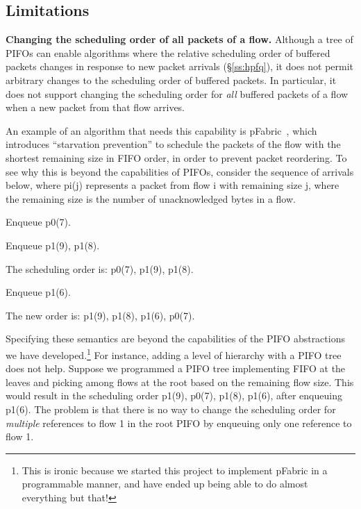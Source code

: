 \subsection{Limitations}
\label{ss:limitations}

\noindent
\textbf{Changing the scheduling order of all packets of a flow.} 
Although a tree of PIFOs can enable algorithms where the relative scheduling order
of buffered packets changes in response to new packet arrivals (\S\ref{ss:hpfq}), it
does not permit arbitrary changes to the scheduling order of buffered
packets. In particular, it does not support changing the scheduling
order for {\em all} buffered packets of a flow when a new packet from
that flow arrives.

An example of an algorithm that needs this capability is
pFabric~\cite{pFabric}, which introduces ``starvation prevention'' to
schedule the packets of the flow with the shortest remaining size in
FIFO order, in order to prevent packet reordering. To see why this is beyond
the capabilities of PIFOs, consider the sequence of arrivals below,
where pi(j) represents a packet from flow i with remaining size j,
where the remaining size is the number of unacknowledged bytes in a flow.
\begin{CompactEnumerate}
\item Enqueue p0(7).
\item Enqueue p1(9), p1(8).
\item The scheduling order is: p0(7), p1(9), p1(8).
\item Enqueue p1(6).
\item The new order is: p1(9), p1(8), p1(6), p0(7).
\end{CompactEnumerate}

Specifying these semantics are beyond the capabilities of the PIFO
abstractions we have developed.\footnote{This is ironic because we
  started this project to implement pFabric in a programmable manner, and
  have ended up being able to do almost everything but that!} For
instance, adding a level of hierarchy with a PIFO tree does not
help. Suppose we programmed a PIFO tree implementing FIFO at the
leaves and picking among flows at the root based on the remaining flow
size. This would result in the scheduling order p1(9), p0(7), p1(8),
p1(6), after enqueuing p1(6). The problem is that there is no way to
change the scheduling order for {\em multiple} references to flow 1 in the
root PIFO by enqueuing only one reference to flow 1.

